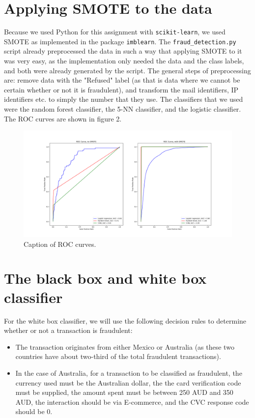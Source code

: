 \documentclass[]{article}
\begin{document}
\section{Applying SMOTE to the data}
Because we used Python for this assignment with \texttt{scikit-learn}, we used SMOTE as implemented in the package \texttt{imblearn}. The \texttt{fraud\_detection.py} script already preprocessed the data in such a way that applying SMOTE to it was very easy, as the implementation only needed the data and the class labels, and both were already generated by the script. The general steps of preprocessing are: remove data with the "Refused" label (as that is data where we cannot be certain whether or not it is fraudulent), and transform the mail identifiers, IP identifiers etc. to simply the number that they use. The classifiers that we used were the random forest classifier, the 5-NN classifier, and the logistic classifier. The ROC curves are shown in figure 2.
\begin{figure}[h!]
	\centering
	\includegraphics[scale = 0.3]{Visualizations/ROC_curves}
	\caption{Caption of ROC curves.}
\end{figure}
\clearpage
\section{The black box and white box classifier}
For the white box classifier, we will use the following decision rules to determine whether or not a transaction is fraudulent:
\begin{itemize}
	\item The transaction originates from either Mexico or Australia (as these two countries have about two-third of the total fraudulent transactions).
	\item In the case of Australia, for a transaction to be classified as fraudulent, the currency used must be the Australian dollar, the the card verification code must be supplied, the amount spent must be between 250 AUD and 350 AUD, the interaction should be via E-commerce, and the CVC response code should be 0.
\end{itemize}
\end{document}
